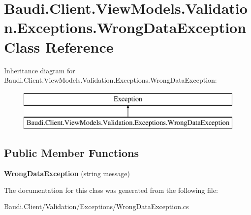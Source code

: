 \hypertarget{class_baudi_1_1_client_1_1_view_models_1_1_validation_1_1_exceptions_1_1_wrong_data_exception}{}\section{Baudi.\+Client.\+View\+Models.\+Validation.\+Exceptions.\+Wrong\+Data\+Exception Class Reference}
\label{class_baudi_1_1_client_1_1_view_models_1_1_validation_1_1_exceptions_1_1_wrong_data_exception}
Inheritance diagram for Baudi.\+Client.\+View\+Models.\+Validation.\+Exceptions.\+Wrong\+Data\+Exception\+:\begin{figure}[H]
\begin{center}
\leavevmode
\includegraphics[height=2.000000cm]{class_baudi_1_1_client_1_1_view_models_1_1_validation_1_1_exceptions_1_1_wrong_data_exception}
\end{center}
\end{figure}
\subsection*{Public Member Functions}
\begin{DoxyCompactItemize}
\item 
\hypertarget{class_baudi_1_1_client_1_1_view_models_1_1_validation_1_1_exceptions_1_1_wrong_data_exception_a3b858845407b36f6b895e8bea237ff0d}{}{\bfseries Wrong\+Data\+Exception} (string message)\label{class_baudi_1_1_client_1_1_view_models_1_1_validation_1_1_exceptions_1_1_wrong_data_exception_a3b858845407b36f6b895e8bea237ff0d}

\end{DoxyCompactItemize}


The documentation for this class was generated from the following file\+:\begin{DoxyCompactItemize}
\item 
Baudi.\+Client/\+Validation/\+Exceptions/Wrong\+Data\+Exception.\+cs\end{DoxyCompactItemize}
